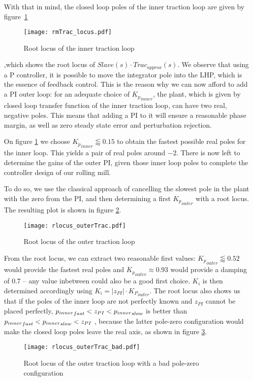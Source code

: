 With that in mind, the closed loop poles of the inner traction loop are given by figure~\ref{fig:rmTracLocus}
\begin{figure}[htbp]
  \centering
  \texttt{[image: rmTrac\_locus.pdf]}
  \caption{Root locus of the inner traction loop\label{fig:rmTracLocus}}
\end{figure}
,which shows the root locus of $Slave(s) \cdot Trac_{approx}(s)$. We observe that using a P controller, it is possible to move the integrator pole into the LHP, which is the essence of feedback control. This is the reason why we can now afford to add a PI outer loop: for an adequate choice of ${K_p}_{inner}$, the plant, which is given by closed loop transfer function of the inner traction loop, can have two real, negative poles. This means that adding a PI to it will ensure a reasonable phase margin, as well as zero steady state error and perturbation rejection.

On figure \ref{fig:rmTracLocus} we choose ${K_p}_{inner} \lessapprox 0.15$ to obtain the fastest possible real poles for the inner loop. This yields a pair of real poles around $-2$. There is now left to determine the gains of the outer PI, given those inner loop poles to complete the controller design of our rolling mill.

To do so, we use the classical approach of cancelling the slowest pole in the plant with the zero from the PI, and then determining a first ${K_p}_{outer}$ with a root locus. The resulting plot is shown in figure \ref{fig:rlocus_OuterTrac}.
\begin{figure}[htbp]
  \centering
  \texttt{[image: rlocus\_outerTrac.pdf]}
  \caption{Root locus of the outer traction loop\label{fig:rlocus_OuterTrac}}
\end{figure}
From the root locus, we can extract two reasonable first values: ${K_p}_{outer} \lessapprox 0.52$ would provide the fastest real poles and ${K_p}_{outer} \approx 0.93$ would provide a damping of $0.7$ -- any value inbetween could also be a good first choice. $K_i$ is then determined accordingly using $K_i = |z_{PI}| \cdot {K_P}_{outer}$. The root locus also shows us that if the poles of the inner loop are not perfectly known and $z_{PI}$ cannot be placed perfectly, ${p_{inner}}_{fast}<\nobreak z_{PI}<\nobreak{p_{inner}}_{slow}$ is better than ${p_{inner}}_{fast}<\nobreak{p_{inner}}_{slow}<\nobreak z_{PI}$
, because the latter pole-zero configuration would make the closed loop poles leave the real axis, as shown in figure \ref{fig:rlocus_outerTrac_bad}.
\begin{figure}[htbp]
  \centering
  \texttt{[image: rlocus\_outerTrac\_bad.pdf]}
  \caption{Root locus of the outer traction loop with a bad pole-zero configuration\label{fig:rlocus_outerTrac_bad}}
\end{figure}

